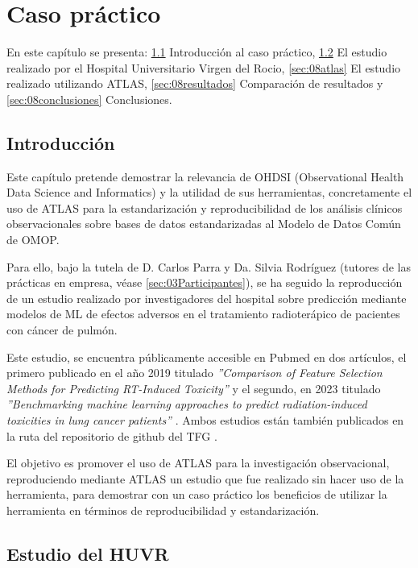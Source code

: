 \chapter{Caso práctico}\label{cap:08pruebas}
En este capítulo se presenta: \ref{sec:08intro} Introducción al caso práctico, \ref{sec:08huvr} El estudio realizado por el Hospital Universitario Virgen del Rocio, \ref{sec:08atlas} El estudio realizado utilizando ATLAS, \ref{sec:08resultados} Comparación de resultados y \ref{sec:08conclusiones} Conclusiones.

\section{Introducción} \label{sec:08intro}

Este capítulo pretende demostrar la relevancia de OHDSI (Observational Health Data Science and Informatics) y la utilidad de sus herramientas, concretamente el uso de ATLAS para la estandarización y reproducibilidad de los análisis clínicos observacionales sobre bases de datos estandarizadas al Modelo de Datos Común de OMOP. 

Para ello, bajo la tutela de D. Carlos Parra y Da. Silvia Rodríguez (tutores de las prácticas en empresa, véase \ref{sec:03Participantes}), se ha seguido la reproducción de un estudio realizado por investigadores del hospital sobre predicción mediante modelos de ML de efectos adversos en el tratamiento radioterápico de pacientes con cáncer de pulmón. 

Este estudio, se encuentra públicamente accesible en Pubmed en dos artículos, el primero publicado en el año 2019 titulado \textit{''Comparison of Feature Selection Methods for Predicting RT-Induced Toxicity'' }\cite{nunez2019comparison} y el segundo, en 2023 titulado \textit{''Benchmarking machine learning approaches to predict radiation-induced toxicities in lung cancer patients''} \cite{nunez2023benchmarking}. Ambos estudios están también publicados en la ruta  del repositorio de github del TFG \cite{vallealonsodc}.

El objetivo es promover el uso de ATLAS para la investigación observacional, reproduciendo mediante ATLAS un estudio que fue realizado sin hacer uso de la herramienta, para demostrar con un caso práctico los beneficios de utilizar la herramienta en términos de reproducibilidad y estandarización.

\section{Estudio del HUVR} \label{sec:08huvr}

